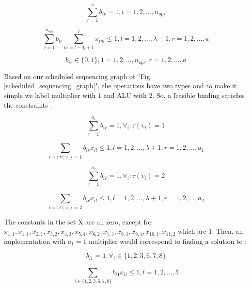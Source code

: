 \begin{equation}\label{a}
 \sum_{r=1}^{a} b_{ir} = 1, i=1,2,...,n_{ops} 
\end{equation}

\begin{equation}\label{b}
\sum_{i=1}^{n_{ops}} b_{ir}\sum_{m=l-d_{i}+1}^{l} x_{im} \leq 1, l=1,2,...,\lambda + 1, r=1,2,...,a 
\end{equation}

\begin{equation}\label{c}
b_{ir} \in \{0,1\}, 1 =1,2,...,n_{ops}, r=1,2,...,a
\end{equation}

 Based on our scheduled sequencing graph of ``Fig. \ref{scheduled_sequencing_graph}", the operations have two types and to make it simple we label multiplier with $1$ and ALU with $2$. So, a feasible binding satisfies the constraints \cite{main}: 

\begin{equation}\label{a}
 \sum_{r=1}^{a_{1}} b_{ir} = 1,\forall_{i} : \tau(v_{i})=1 
\end{equation}

\begin{equation}\label{b}
\sum_{i=:\tau(v_{i})=1}^{} b_{ir} x_{il} \leq 1, l=1,2,...,\lambda + 1, r=1,2,...,a_{1}
\end{equation}

\begin{equation}\label{c}
\sum_{r=1}^{a_{2}} b_{ir} = 1,\forall_{i} : \tau(v_{i})=2
\end{equation}

\begin{equation}\label{a}
 \sum_{i=:\tau(v_{i})=2}^{} b_{ir} x_{il} \leq 1, l=1,2,...,\lambda + 1, r=1,2,...,a_{2}
\end{equation}

The constants in the set X are all zero, except for $ x_{1,1},x_{1,1},x_{2,1},x_{3,2},x_{4,3},x_{5,4},x_{6,2},x_{7,3},x_{8,3},x_{9,4},x_{10,1},x_{11,2} $ which are 1. Then, an implementation with $ a_{1} =1$ multiplier would correspond to finding a solution to \cite{main} : 

\begin{equation}\label{b}
b_{i1} = 1, \forall_{i} \in \{1,2,3,6,7,8\}
\end{equation}

\begin{equation}\label{c}
\sum_{i\in \{1,2,3,6,7,8\}}^{} b_{i1} x_{il} \leq 1, l=1,2,...,5
\end{equation}



